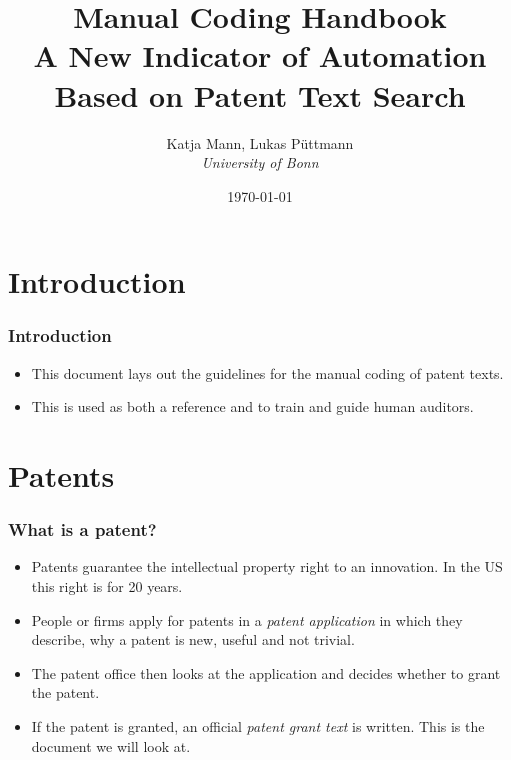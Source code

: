 \documentclass[10pt]{beamer}
\title {\textbf{Manual Coding Handbook} \\[1cm]
A New Indicator of Automation \\ Based on Patent Text Search}
\author{
Katja Mann, Lukas P\"uttmann \\  
\textit{University of Bonn}}
\date{\today}
\begin{document}
\begin{frame}
\titlepage
\end{frame}


\section{Introduction}
\setcounter{subsection}{1} %

\begin{frame}\frametitle{Introduction}
	\begin{itemize}	
		\item This document lays out the guidelines for the manual coding of patent texts.
		\item This is used as both a reference and to train and guide human auditors.
	\end{itemize}
\end{frame}


\section{Patents}
\setcounter{subsection}{1} %

\begin{frame}\frametitle{What is a patent?}
	\begin{itemize}	
		\item Patents guarantee the intellectual property right to an innovation. In the US this right is for 20 years. 
		\item People or firms apply for patents in a \textit{patent application} in which they describe, why a patent is new, useful and not trivial.
		\item The patent office then looks at the application and decides whether to grant the patent.
		\item If the patent is granted, an official \textit{patent grant text} is written. This is the document we will look at.
	\end{itemize}
\end{frame}
\end{document}
